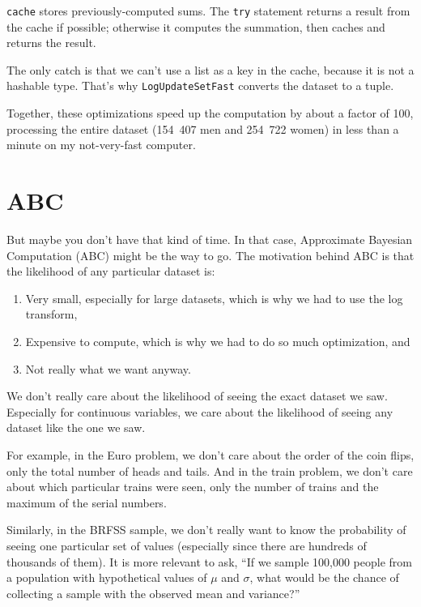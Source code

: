 \documentclass[12pt]{book}
\begin{document}
{\tt cache} stores previously-computed sums.  The {\tt try} statement
returns a result from the cache if possible; otherwise it computes
the summation, then caches and returns the result.

The only catch is that we can't use a list as a key in the cache, because
it is not a hashable type.  That's why {\tt LogUpdateSetFast} converts
the dataset to a tuple.

Together, these optimizations speed up the computation by about a
factor of 100, processing the entire dataset (154~407 men and 254~722
women) in less than a minute on my not-very-fast computer.


\section{ABC}

But maybe you don't have that kind of time.  In that case, Approximate
Bayesian Computation (ABC) might be the way to go.  The motivation
behind ABC is that the likelihood of any particular dataset is:

\begin{enumerate}

\item Very small, especially for large datasets, which is why we had
to use the log transform,

\item Expensive to compute, which is why we had to do so much
optimization, and

\item Not really what we want anyway.

\end{enumerate}

We don't really care about the likelihood of seeing the exact dataset
we saw.  Especially for continuous variables, we care about the
likelihood of seeing any dataset like the one we saw.

For example, in the Euro problem, we don't care about the order of
the coin flips, only the total number of heads and tails.  And in
the train problem, we don't care about which particular trains were
seen, only the number of trains and the maximum of the serial numbers.

Similarly, in the BRFSS sample, we don't really want to know the
probability of seeing one particular set of values (especially since
there are hundreds of thousands of them).  It is more
relevant to ask, ``If we sample 100,000 people from a population
with hypothetical values of $\mu$ and $\sigma$, what would be
the chance of collecting a sample with the observed mean and
variance?''
\end{document}
